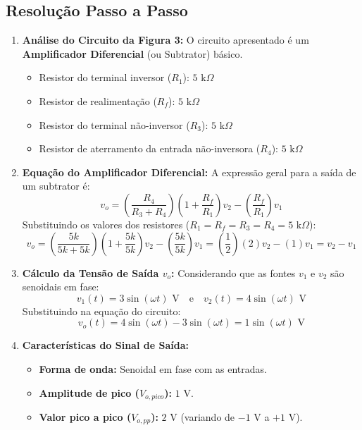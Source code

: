 \subsection*{Resolução Passo a Passo}
\begin{enumerate}
    \item \textbf{Análise do Circuito da Figura 3:}
    O circuito apresentado é um \textbf{Amplificador Diferencial} (ou Subtrator) básico.
    \begin{itemize}
        \item Resistor do terminal inversor ($R_1$): $5\text{ k}\Omega$
        \item Resistor de realimentação ($R_f$): $5\text{ k}\Omega$
        \item Resistor do terminal não-inversor ($R_3$): $5\text{ k}\Omega$
        \item Resistor de aterramento da entrada não-inversora ($R_4$): $5\text{ k}\Omega$
    \end{itemize}

    \item \textbf{Equação do Amplificador Diferencial:}
    A expressão geral para a saída de um subtrator é:
    \begin{equation*}
        v_o = \left( \frac{R_4}{R_3 + R_4} \right) \left( 1 + \frac{R_f}{R_1} \right) v_2 - \left( \frac{R_f}{R_1} \right) v_1
    \end{equation*}
    Substituindo os valores dos resistores ($R_1 = R_f = R_3 = R_4 = 5\text{ k}\Omega$):
    \begin{equation*}
        v_o = \left( \frac{5k}{5k + 5k} \right) \left( 1 + \frac{5k}{5k} \right) v_2 - \left( \frac{5k}{5k} \right) v_1 = \left( \frac{1}{2} \right) (2) v_2 - (1) v_1 = v_2 - v_1
    \end{equation*}

    \item \textbf{Cálculo da Tensão de Saída $v_o$:}
    Considerando que as fontes $v_1$ e $v_2$ são senoidais em fase:
    \begin{equation*}
        v_1(t) = 3 \sin(\omega t)\text{ V} \quad \text{e} \quad v_2(t) = 4 \sin(\omega t)\text{ V}
    \end{equation*}
    Substituindo na equação do circuito:
    \begin{equation*}
        v_o(t) = 4 \sin(\omega t) - 3 \sin(\omega t) = 1 \sin(\omega t)\text{ V}
    \end{equation*}

    \item \textbf{Características do Sinal de Saída:}
    \begin{itemize}
        \item \textbf{Forma de onda:} Senoidal em fase com as entradas.
        \item \textbf{Amplitude de pico ($V_{o,pico}$):} $1\text{ V}$.
        \item \textbf{Valor pico a pico ($V_{o,pp}$):} $2\text{ V}$ (variando de $-1\text{ V}$ a $+1\text{ V}$).
    \end{itemize}
\end{enumerate}

